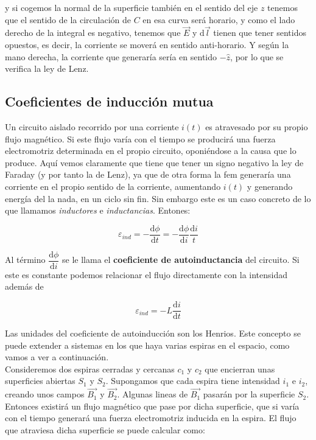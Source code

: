 \documentclass[12pt,a4paper]{article}
\newcommand{\D}{\mathrm{d}}
\begin{document}
y si cogemos la normal de la superficie también en el sentido del eje $z$ tenemos que el sentido de la circulación de $C$ en esa curva será horario, y como el lado derecho de la integral es negativo, tenemos que $\vec{E}$ y $\D \vec{ l}$ tienen que tener sentidos opuestos, es decir, la corriente se moverá en sentido anti-horario. Y según la mano derecha, la corriente que generaría sería en sentido $- \widehat{z}$, por lo que se verifica la ley de Lenz. 

\subsection{Coeficientes de inducción mutua} \label{Subsec:4.4}

Un circuito aislado recorrido por una corriente $i(t)$ es atravesado por su propio flujo magnético. Si este flujo varía con el tiempo se producirá una fuerza electromotriz determinada en el propio circuito, oponiéndose a la causa que lo produce. Aquí vemos claramente que tiene que tener un signo negativo la ley de Faraday (y por tanto la de Lenz), ya que de otra forma la fem generaría una corriente en el propio sentido de la corriente, aumentando $i(t)$ y generando energía del la nada, en un ciclo sin fin. Sin embargo este es un caso concreto de lo que llamamos \textit{inductores} e \textit{inductancias}. Entones:

\begin{equation}
\varepsilon_{ind} = - \dfrac{\D \phi}{\D t} = - \dfrac{ \D \phi}{\D i} \dfrac{\D i}{t}
\end{equation}

Al término $\dfrac{\D \phi}{\D i}$ se le llama el \textbf{coeficiente de autoinductancia} del circuito. Si este es constante podemos relacionar el flujo directamente con la intensidad además de

\begin{equation}
\varepsilon_{ind} = - L \dfrac{\D i}{\D t}
\end{equation}

Las unidades del coeficiente de autoinducción son los Henrios. Este concepto se puede extender a sistemas en los que haya varias espiras en el espacio, como vamos a ver a continuación. \\

Consideremos dos espiras cerradas y cercanas $c_1$ y $c_2$ que encierran unas superficies abiertas $S_1$ y $S_2$. Supongamos que cada espira tiene intensidad $i_1$ e $i_2$, creando unos campos $\vec{B_1}$ y $\vec{B_2}$. Algunas lineas de $\vec{B_1}$ pasarán por la superficie $S_2$. Entonces existirá un flujo magnético que pase por dicha superficie, que si varía con el tiempo generará una fuerza electromotriz inducida en la espira. El flujo que atraviesa dicha superficie se puede calcular como:
\end{document}
